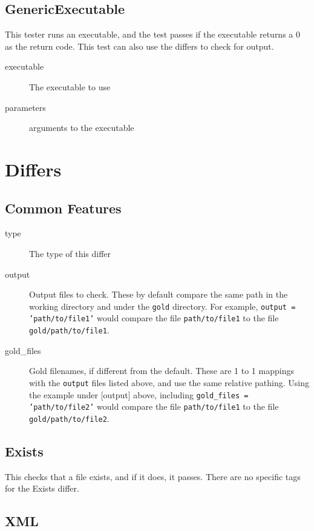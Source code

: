 \documentclass{article}
\begin{document}
\subsection{GenericExecutable}

This tester runs an executable, and the test passes if the executable
returns a 0 as the return code.  This test can also use the differs to
check for output.

\begin{description}
  \item[executable] The executable to use
  \item[parameters] arguments to the executable
\end{description}

\section{Differs}

\subsection{Common Features}

\begin{description}
  \item[type] The type of this differ
  \item[output] Output files to check. These by default compare the same path in the working directory
      and under the \texttt{gold} directory. For example, \texttt{output = 'path/to/file1'} would compare
      the file \texttt{path/to/file1} to the file \texttt{gold/path/to/file1}.
  \item[gold\_files] Gold filenames, if different from the default. These are 1 to 1 mappings with the
      \texttt{output} files listed above, and use the same relative pathing. Using the example under
      [output] above, including \texttt{gold\_files = 'path/to/file2'} would compare the file
      \texttt{path/to/file1} to the file \texttt{gold/path/to/file2}.
\end{description}

\subsection{Exists}

This checks that a file exists, and if it does, it passes.  There are
no specific tags for the Exists differ.

\subsection{XML}
\end{document}
